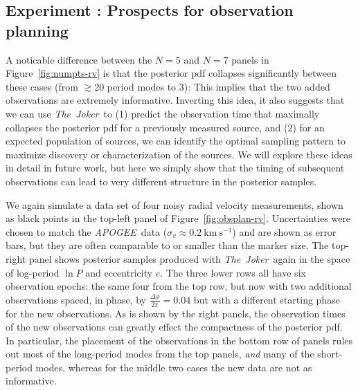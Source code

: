 \documentclass[manuscript, letterpaper]{aastex6}
\newcommand{\project}[1]{\textsl{#1}}
\newcommand{\acronym}[1]{{\small{#1}}}
\newcommand{\apogee}{\project{\acronym{APOGEE}}}
\newcommand{\samplername}{\project{The~Joker}}
\newcommand{\figname}{Figure}
\newcommand{\kms}{\mathrm{km}~\mathrm{s}^{-1}}
\newcounter{expcounter}
\begin{document}
\subsection{Experiment : Prospects for observation planning}
\label{sec:obsplan}

A noticable difference between the $N=5$ and $N=7$ panels in
\figname~\ref{fig:numpts-rv} is that the posterior pdf collapses significantly
between these cases (from $\gtrsim$20 period modes to 3):
This implies that the two added observations are extremely informative.
Inverting this idea, it also suggests that we can use \samplername\ to (1)
predict the observation time that maximally collapses the posterior pdf for a
previously measured source, and (2) for an expected population of sources, we
can identify the optimal sampling pattern to maximize discovery or
characterization of the sources.
We will explore these ideas in detail in future work, but here we simply show
that the timing of subsequent observations can lead to very different
structure in the posterior samples.

We again simulate a data set of four noisy radial velocity measurements, shown
as black points in the top-left panel of \figname~\ref{fig:obsplan-rv}.
Uncertainties were chosen to match the \apogee\ data ($\sigma_v \approx
0.2~\kms$) and are shown as error bars, but they are often comparable to or
smaller than the marker size.
The top-right panel shows posterior samples produced with \samplername\ again in the
space of log-period $\ln P$ and eccentricity $e$.
The three lower rows all have six observation epochs: the same four from the top row,
but now with two additional observations spaced, in phase, by $\frac{\Delta
\phi}{2 \pi} = 0.04$ but with a different starting phase for the new
observations.
As is shown by the right panels, the observation times of the new observations
can greatly effect the compactness of the posterior pdf.
In particular, the placement of the observations in the bottom row of panels
rules out most of the long-period modes from the top panels, \emph{and} many of
the short-period modes, whereas for the middle two cases the new data are not as
informative.
\end{document}
